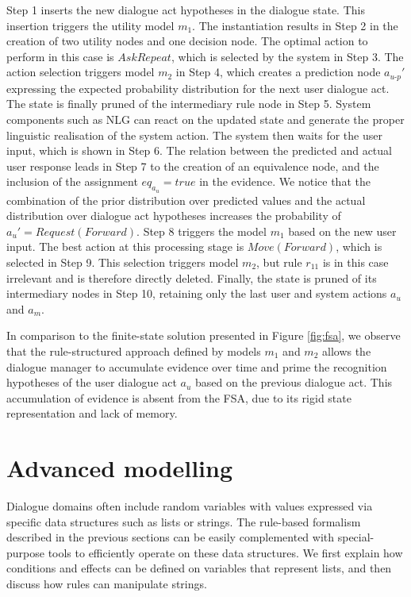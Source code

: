 Step 1 inserts the new dialogue act hypotheses in the dialogue state.  This insertion triggers 
the utility model $m_1$. The instantiation results in Step 2 in the creation of two utility nodes and one decision node.  The optimal action to perform in this case is $\mathit{AskRepeat}$, which is selected by the system in Step 3. The action selection triggers model $m_2$ in Step 4, which creates a prediction node $a_{u\mbox{-}p}'$ expressing the expected probability distribution for the next user dialogue act. The state is finally pruned of the intermediary rule node in Step 5.  System components such as NLG can react on the updated state and generate the proper linguistic realisation of the system action. The system then waits for the user input, which is shown in Step 6.  The relation between the predicted and actual user response leads in Step 7 to the creation of an equivalence node, and the inclusion of the assignment $\mathit{eq}_{a_u} = true$ in the evidence. We notice that the combination of the prior distribution over predicted values and the actual distribution over dialogue act hypotheses increases the probability of $a_u' = \mathit{Request(Forward)}$. Step 8 triggers the model $m_1$ based on the new user input.  The best action at this processing stage is $\mathit{Move(Forward)}$, which is selected in Step 9.  This selection triggers model $m_2$, but rule $r_{11}$ is in this case irrelevant and is therefore directly deleted. Finally, the state is pruned of its intermediary nodes in Step 10, retaining only the last user and system actions $a_u$ and $a_m$. 

In comparison to the finite-state solution presented in Figure \ref{fig:fsa}, we observe that the rule-structured approach defined by models $m_1$ and $m_2$ allows the dialogue manager to accumulate evidence over time and prime the recognition hypotheses of the user dialogue act $a_u$ based on the previous dialogue act.  This accumulation of evidence is absent from the FSA, due to its rigid state representation and lack of memory. 

\section{Advanced modelling}
\label{sec:amodelling}

Dialogue domains often include random variables with values expressed via specific data structures such as lists or strings. The rule-based formalism described in the previous sections can be easily complemented with special-purpose tools to efficiently operate on these data structures. We first explain how conditions and effects can be defined on variables that represent lists, and then discuss how rules can manipulate strings. 

